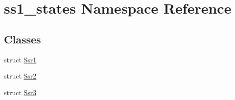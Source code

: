 \hypertarget{namespacess1__states}{}\section{ss1\+\_\+states Namespace Reference}
\label{namespacess1__states}
\subsection*{Classes}
\begin{DoxyCompactItemize}
\item 
struct \hyperlink{structss1__states_1_1Ssr1}{Ssr1}
\item 
struct \hyperlink{structss1__states_1_1Ssr2}{Ssr2}
\item 
struct \hyperlink{structss1__states_1_1Ssr3}{Ssr3}
\end{DoxyCompactItemize}
